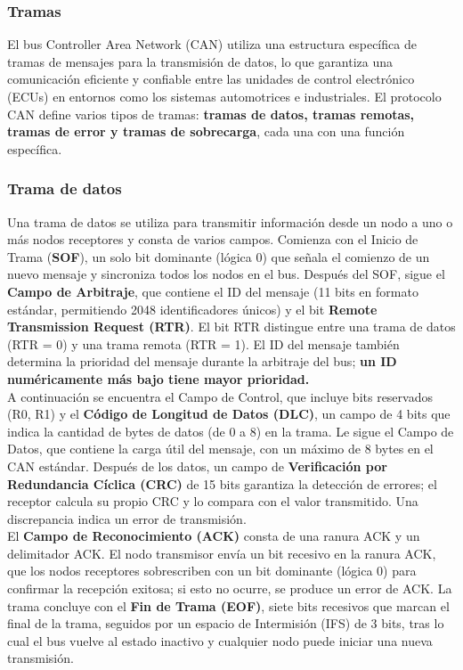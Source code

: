 \subsubsection{Tramas}
El bus Controller Area Network (CAN) utiliza una estructura específica de tramas de mensajes para la transmisión de datos, lo que garantiza una comunicación eficiente y confiable entre las unidades de control electrónico (ECUs) en entornos como los sistemas automotrices e industriales.
El protocolo CAN define varios tipos de tramas: \textbf{tramas de datos, tramas remotas, tramas de error y tramas de sobrecarga}, cada una con una función específica.\\
\subsubsection*{Trama de datos}
Una trama de datos se utiliza para transmitir información desde un nodo a uno o más nodos receptores y consta de varios campos.
Comienza con el Inicio de Trama (\textbf{SOF}), un solo bit dominante (lógica 0) que señala el comienzo de un nuevo mensaje y sincroniza todos los nodos en el bus.
Después del SOF, sigue el \textbf{Campo de Arbitraje}, que contiene el ID del mensaje (11 bits en formato estándar, permitiendo 2048 identificadores únicos) y el bit \textbf{Remote Transmission Request (RTR)}.
El bit RTR distingue entre una trama de datos (RTR = 0) y una trama remota (RTR = 1).
El ID del mensaje también determina la prioridad del mensaje durante la arbitraje del bus; \textbf{un ID numéricamente más bajo tiene mayor prioridad.}\\

A continuación se encuentra el Campo de Control, que incluye bits reservados (R0, R1) y el \textbf{Código de Longitud de Datos (DLC)}, un campo de 4 bits que indica la cantidad de bytes de datos (de 0 a 8) en la trama.
Le sigue el Campo de Datos, que contiene la carga útil del mensaje, con un máximo de 8 bytes en el CAN estándar.
Después de los datos, un campo de \textbf{Verificación por Redundancia Cíclica (CRC)} de 15 bits garantiza la detección de errores; el receptor calcula su propio CRC y lo compara con el valor transmitido.
Una discrepancia indica un error de transmisión.\\

El \textbf{Campo de Reconocimiento (ACK)} consta de una ranura ACK y un delimitador ACK.
El nodo transmisor envía un bit recesivo en la ranura ACK, que los nodos receptores sobrescriben con un bit dominante (lógica 0) para confirmar la recepción exitosa; si esto no ocurre, se produce un error de ACK.
La trama concluye con el \textbf{ Fin de Trama (EOF)}, siete bits recesivos que marcan el final de la trama, seguidos por un espacio de Intermisión (IFS) de 3 bits, tras lo cual el bus vuelve al estado inactivo y cualquier nodo puede iniciar una nueva transmisión.\\
